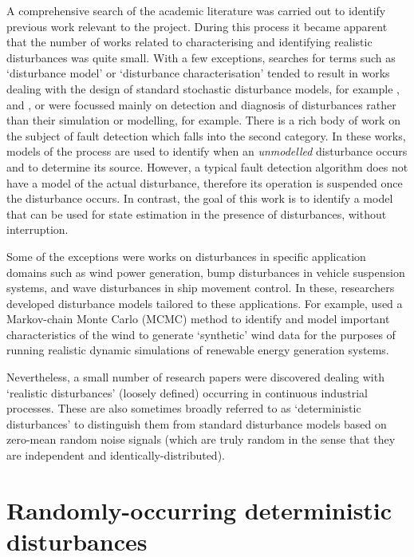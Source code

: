 A comprehensive search of the academic literature was carried out to identify previous work relevant to the project. During this process it became apparent that the number of works related to characterising and identifying realistic disturbances was quite small. With a few exceptions, searches for terms such as `disturbance model' or `disturbance characterisation' tended to result in works dealing with the design of standard stochastic disturbance models, for example \cite{muske_badgwell_disturbance_2002}, and \cite{pannocchia_robust_2003}, or were focussed mainly on detection and diagnosis of disturbances rather than their simulation or modelling, \cite{thornhill_advances_2007} for example. There is a rich body of work on the subject of fault detection which falls into the second category. In these works, models of the process are used to identify when an \textit{unmodelled} disturbance occurs and to determine its source. However, a typical fault detection algorithm does not have a model of the actual disturbance, therefore its operation is suspended once the disturbance occurs. In contrast, the goal of this work is to identify a model that can be used for state estimation in the presence of disturbances, without interruption.

Some of the exceptions were works on disturbances in specific application domains such as wind power generation, bump disturbances in vehicle suspension systems, and wave disturbances in ship movement control.  In these, researchers developed disturbance models tailored to these applications. For example, \cite{papaefthymiou_mcmc_2008} used a Markov-chain Monte Carlo (MCMC) method to identify and model important characteristics of the wind to generate `synthetic' wind data for the purposes of running realistic dynamic simulations of renewable energy generation systems.

Nevertheless, a small number of research papers were discovered dealing with `realistic disturbances' (loosely defined) occurring in continuous industrial processes. These are also sometimes broadly referred to as `deterministic disturbances' to distinguish them from standard disturbance models based on zero-mean random noise signals (which are truly random in the sense that they are independent and identically-distributed).

\section*{Randomly-occurring deterministic disturbances} \label{RODDs}


